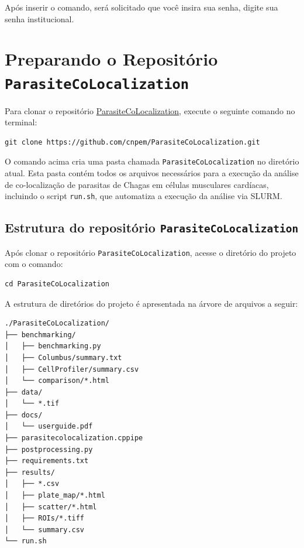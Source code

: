 \documentclass{article}
\begin{document}
Após inserir o comando, será solicitado que você insira sua senha, digite sua senha institucional.

\section{Preparando o Repositório \texttt{ParasiteCoLocalization}}

Para clonar o repositório \href{https://github.com/cnpem/ParasiteCoLocalization}{ParasiteCoLocalization}, execute o seguinte comando no terminal:

\begin{verbatim}
git clone https://github.com/cnpem/ParasiteCoLocalization.git
\end{verbatim}

O comando acima cria uma pasta chamada \texttt{ParasiteCoLocalization} no diretório atual. Esta pasta contém todos os arquivos necessários para a execução da análise de co-localização de parasitas de Chagas em células musculares cardíacas, incluindo o script \texttt{run.sh}, que automatiza a execução da análise via SLURM.

\subsection{Estrutura do repositório \texttt{ParasiteCoLocalization}}

Após clonar o repositório \texttt{ParasiteCoLocalization}, acesse o diretório do projeto com o comando:

\begin{verbatim}
cd ParasiteCoLocalization
\end{verbatim}

A estrutura de diretórios do projeto é apresentada na árvore de arquivos a seguir:

\begin{verbatim}
./ParasiteCoLocalization/
├── benchmarking/
│   ├── benchmarking.py
│   ├── Columbus/summary.txt
│   ├── CellProfiler/summary.csv
│   └── comparison/*.html
├── data/
│   └── *.tif
├── docs/
│   └── userguide.pdf
├── parasitecolocalization.cppipe
├── postprocessing.py
├── requirements.txt
├── results/
│   ├── *.csv
│   ├── plate_map/*.html
│   ├── scatter/*.html
│   ├── ROIs/*.tiff
│   └── summary.csv
└── run.sh
\end{verbatim}
\end{document}
